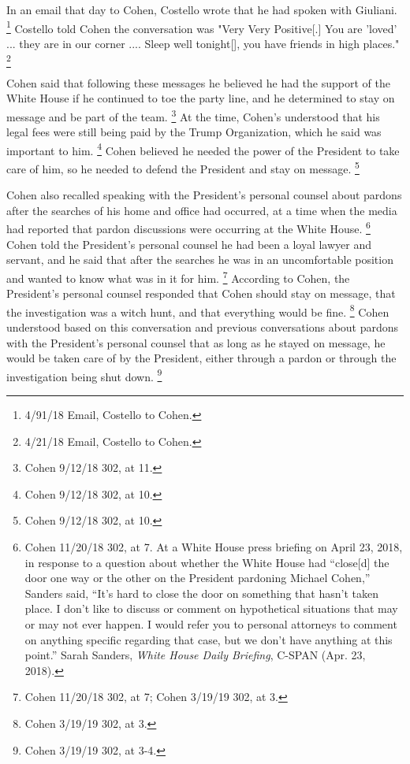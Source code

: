 {In an email that day to Cohen, Costello wrote that he had spoken with Giuliani.%
\footnote{4/91/18 Email, Costello to Cohen.}
Costello told Cohen the conversation was "Very Very Positive[.] You are 'loved' ... they are in our corner .... Sleep well tonight[], you have friends in high places."%
\footnote{4/21/18 Email, Costello to Cohen. }

Cohen said that following these messages he believed he had the support of the White House if he continued to toe the party line, and he determined to stay on message and be part of the team.%
\footnote{Cohen 9/12/18 302, at 11.}
At the time, Cohen's understood that his legal fees were still being paid by the Trump Organization, which he said was important to him.%
\footnote{Cohen 9/12/18 302, at 10.}
Cohen believed he needed the power of the President to take care of him, so he needed to defend the President and stay on message.%
\footnote{Cohen 9/12/18 302, at 10.}

Cohen also recalled speaking with the President's personal counsel about pardons after the searches of his home and office had occurred, at a time when the media had reported that pardon discussions were occurring at the White House.%
\footnote{Cohen 11/20/18 302, at 7.
At a White House press briefing on April 23, 2018, in response to a question about whether the White House had “close[d] the door one way or the other on the President pardoning Michael Cohen,” Sanders said, “It’s hard to close the door on something that hasn’t taken place.
I don’t like to discuss or comment on hypothetical situations that may or may not ever happen.
I would refer you to personal attorneys to comment on anything specific regarding that case, but we don’t have anything at this point.”
Sarah Sanders, \textit{White House Daily Briefing}, C-SPAN (Apr. 23, 2018).}
Cohen told the President's personal counsel he had been a loyal lawyer and servant, and he said that after the searches he was in an uncomfortable position and wanted to know what was in it for him.%
\footnote{Cohen 11/20/18 302, at 7;
Cohen 3/19/19 302, at 3.}
According to Cohen, the President's personal counsel responded that Cohen should stay on message, that the investigation was a witch hunt, and that everything would be fine.%
\footnote{Cohen 3/19/19 302, at 3.}
Cohen understood based on this conversation and previous conversations about pardons with the President's personal counsel that as long as he stayed on message, he would be taken care of by the President, either through a pardon or through the investigation being shut down.%
\footnote{Cohen 3/19/19 302, at 3-4.}

}
